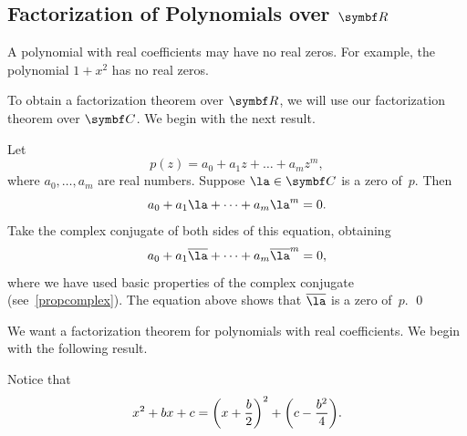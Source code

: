     \subsection{Factorization of Polynomials over $\R{}$}


A polynomial with real coefficients may have no real zeros.  For example, the
polynomial\/ $1 + x^2$ has no real zeros.

To obtain a factorization theorem over $\R{}$, we will use our factorization theorem over $\C{}$. We begin with the next result.


\proof
Let
\[
p(z) = a_0 + a_1 z + \dots + a_m z^m\!,
\]
where $a_0, \dots, a_m$ are real numbers.  Suppose $\la \in \C{}$ is a zero
of~$p$.  Then
\[
a_0 + a_1 \la + \dots + a_m \la^m = 0.
\]
Take the complex conjugate of both sides of this equation, obtaining
\[
a_0 + a_1 \bar{\la} + \dots + a_m \bar{\la}^m = 0,
\]
where we have used basic properties of the complex conjugate (see~\ref{propcomplex}).  The equation above shows that $\bar{\la}$ is a zero of~$p$.
\qed


We want a factorization theorem for polynomials with real
coefficients.  We begin with the following result.


\proof
Notice that
\[
x^2 + b x + c =
\paren[\bigg]{x + \frac{b}{2}}^2 + \paren[\bigg]{c -\frac{b^2}{4}}.
\]

